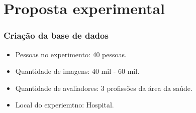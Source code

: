 \section{Proposta experimental}




\begin{frame}
\frametitle{Criação da base de dados}

\begin{itemize}
\item Pessoas no experimento: 40 pessoas.
\item Quantidade de imagens: 40 mil - 60 mil.
\item Quantidade de avaliadores: 3 profissões da área da saúde.
\item Local do experiemtno: Hospital.
\end{itemize}


\end{frame}


